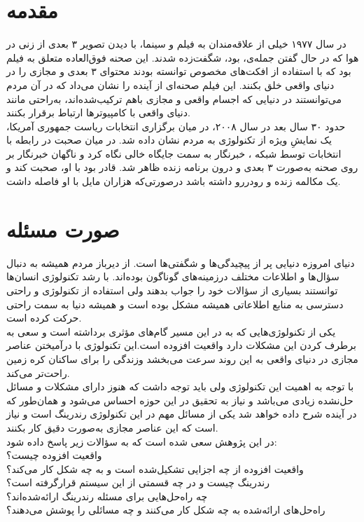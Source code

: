 \section{مقدمه}
در سال ۱۹۷۷ خیلی از علاقه‌مندان به فیلم و سینما، با دیدن تصویر ۳ بعدی از زنی در هوا که در حال گفتن جمله‌ی،   بود، شگفت‌زده شدند. این صحنه فوق‌العاده متعلق به فیلم  بود که با استفاده از افکت‌های مخصوص توانسته بودند محتوای ۳ بعدی و مجازی را در دنیای واقعی خلق بکنند. این فیلم صحنه‌ای از آینده را نشان می‌داد که در آن مردم می‌توانستند در دنیایی که اجسام واقعی و مجازی باهم ترکیب‌شده‌اند، به‌راحتی مانند دنیای واقعی با کامپیوترها ارتباط برقرار بکنند.
\\
حدود ۳۰ سال بعد در سال ۲۰۰۸، در میان برگزاری انتخابات ریاست جمهوری آمریکا، یک نمایشِ ویژه از تکنولوژی به مردم نشان داده شد. در میان صحبت در رابطه با انتخابات توسط شبکه ، خبرنگار به سمت جایگاه خالی نگاه کرد و ناگهان خبرنگار  بر روی صحنه به‌صورت ۳ بعدی و درون برنامه زنده ظاهر شد.  قادر بود با او، صحبت کند و یک مکالمه زنده و رودررو داشته باشد درصورتی‌که   هزاران مایل با او فاصله داشت.
\section{صورت مسئله}
دنیای امروزه دنیایی پر از پیچیدگی‌ها و شگفتی‌ها است. از دیرباز مردم همیشه به دنبال سؤال‌ها و اطلاعات مختلف درزمینه‌های گوناگون بوده‌اند.
با رشد تکنولوژی انسان‌ها توانستند بسیاری از سؤالات خود را جواب بدهند ولی استفاده از تکنولوژی و راحتی دسترسی به منابع اطلاعاتی همیشه مشکل بوده است و همیشه دنیا به سمت راحتی حرکت کرده است.
\\
یکی از تکنولوژی‌هایی که به در این مسیر گام‌های مؤثری برداشته است و سعی به برطرف کردن این مشکلات دارد واقعیت افزوده است.این تکنولوژی با درآمیختن عناصر مجازی در دنیای واقعی به این روند سرعت می‌بخشد وزندگی را برای ساکنان کره زمین راحت‌تر می‌کند.
\\
با توجه به اهمیت این تکنولوژی ولی باید توجه داشت که هنوز دارای مشکلات و مسائل حل‌نشده زیادی می‌باشد و نیاز به تحقیق در این حوزه احساس می‌شود و همان‌طور که در آینده شرح داده خواهد شد یکی از مسائل مهم در این تکنولوژی رندرینگ است و نیاز است که این عناصر مجازی به‌صورت دقیق کار بکنند.
\\
در این پژوهش سعی شده است که به سؤالات زیر پاسخ داده شود:
\\
واقعیت افزوده چیست؟
\\
واقعیت افزوده از چه اجزایی تشکیل‌شده است و به چه شکل کار می‌کند؟
\\
رندرینگ چیست و در چه قسمتی از این سیستم قرارگرفته است؟
\\
چه راه‌حل‌هایی برای مسئله رندرینگ ارائه‌شده‌اند؟
\\
راه‌حل‌های ارائه‌شده به چه شکل کار می‌کنند و چه مسائلی را پوشش می‌دهند؟



